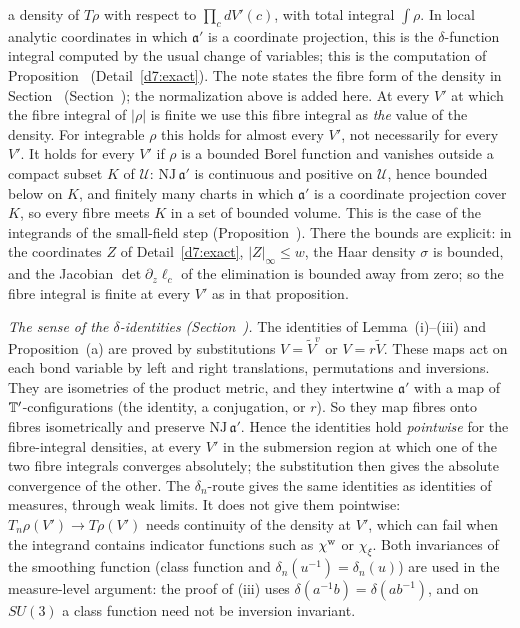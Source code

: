 \begin{detail}
\begin{step}
a density of $T\rho$ with respect to $\prod_cdV'(c)$, with total integral $\int\rho$. In local analytic coordinates in which $\mathfrak a'$ is a coordinate projection, this is the $\delta$-function integral computed by the usual change of variables; this is the computation of Proposition~ (Detail~\ref{d7:exact}). The note states the fibre form of the density in Section~ (Section~); the normalization above is added here. At every $V'$ at which the fibre integral of $|\rho|$ is finite we use this fibre integral as \emph{the} value of the density. For integrable $\rho$ this holds for almost every $V'$, not necessarily for every $V'$. It holds for every $V'$ if $\rho$ is a bounded Borel function and vanishes outside a compact subset $K$ of $\mathcal U$: $\mathrm{NJ}\,\mathfrak a'$ is continuous and positive on $\mathcal U$, hence bounded below on $K$, and finitely many charts in which $\mathfrak a'$ is a coordinate projection cover $K$, so every fibre meets $K$ in a set of bounded volume. This is the case of the integrands of the small-field step (Proposition~). There the bounds are explicit: in the coordinates $Z$ of Detail~\ref{d7:exact}, $|Z|_\infty\le w$, the Haar density $\sigma$ is bounded, and the Jacobian $\det\partial_z\ell_c$ of the elimination is bounded away from zero; so the fibre integral is finite at every $V'$ as in that proposition.
\end{step}
\begin{step}
\emph{The sense of the $\delta$-identities (Section~).} The identities of Lemma~(i)--(iii) and Proposition~(a) are proved by substitutions $V=\tilde V^v$ or $V=r\tilde V$. These maps act on each bond variable by left and right translations, permutations and inversions. They are isometries of the product metric, and they intertwine $\mathfrak a'$ with a map of $\mathbb T'$-configurations (the identity, a conjugation, or $r$). So they map fibres onto fibres isometrically and preserve $\mathrm{NJ}\,\mathfrak a'$. Hence the identities hold \emph{pointwise} for the fibre-integral densities, at every $V'$ in the submersion region at which one of the two fibre integrals converges absolutely; the substitution then gives the absolute convergence of the other. The $\delta_n$-route gives the same identities as identities of measures, through weak limits. It does not give them pointwise: $T_n\rho(V')\to T\rho(V')$ needs continuity of the density at $V'$, which can fail when the integrand contains indicator functions such as $\chi^{\rm w}$ or $\chi_\xi$. Both invariances of the smoothing function (class function and $\delta_n(u^{-1})=\delta_n(u)$) are used in the measure-level argument: the proof of (iii) uses $\delta(a^{-1}b)=\delta(ab^{-1})$, and on $SU(3)$ a class function need not be inversion invariant.

\end{step}
\end{detail}
